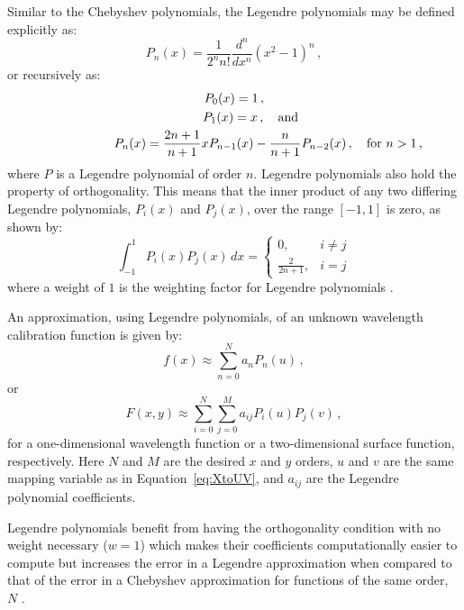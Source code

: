 Similar to the Chebyshev polynomials, the Legendre polynomials may be defined explicitly as:
\begin{equation}
    P_{n}(x) = \frac{1}{2^{n} n!} \frac{d^{n}}{d x^{n}} (x^{2} - 1)^{n}\,,\label{eq:legpolyexplicit}
\end{equation}
or recursively as:
\begin{equation}
    \begin{gathered}
        P_{0}(x) = 1\,,\\
        P_{1}(x) = x\,,\rlap{\quad and}\\
        P_{n}(x) = \frac{2 n + 1}{n + 1} x P_{n - 1}(x) - \frac{n}{n + 1} P_{n - 2}(x)\,,\rlap{\quad for $n > 1$\,,}
    \end{gathered}\label{eq:legpoly}
\end{equation}
where $P$ is a Legendre polynomial of order $n$. Legendre polynomials also hold the property of orthogonality. This means that the inner product of any two differing Legendre polynomials, $P_{i}(x)$ and $P_{j}(x)$, over the range $[-1, 1]$ is zero, as shown by:
\begin{equation}
    \int_{-1}^{1} P_{i}(x) P_{j}(x) \,dx =
    \begin{cases}
        0,                 & i \neq j \\
        \frac{2}{2 n + 1}, & i = j
    \end{cases}\label{eq:legorth}
\end{equation}
where a weight of $1$ is the weighting factor for Legendre polynomials \citep{numerical_recipes, leg}.

An approximation, using Legendre polynomials, of an unknown wavelength calibration function is given by:
\begin{equation}
    f(x) \approx \sum_{n = 0}^{N} a_{n} P_{n}(u)\,,\label{eq:legendre}
\end{equation}
or
\begin{equation}
    F(x, y) \approx \sum_{i = 0}^{N} \sum_{j = 0}^{M} a_{ij} P_{i}(u) P_{j}(v)\,,\label{eq:Legendre2D}
\end{equation}
for a one-dimensional wavelength function or a two-dimensional surface function, respectively. Here $N$ and $M$ are the desired $x$ and $y$ orders, $u$ and $v$ are the same mapping variable as in Equation~\ref{eq:XtoUV}, and $a_{ij}$ are the Legendre polynomial coefficients.

Legendre polynomials benefit from having the orthogonality condition with no weight necessary ($w = 1$) which makes their coefficients computationally easier to compute but increases the error in a Legendre approximation when compared to that of the error in a Chebyshev approximation for functions of the same order, $N$ \citep{leg_cheb_relation}.

